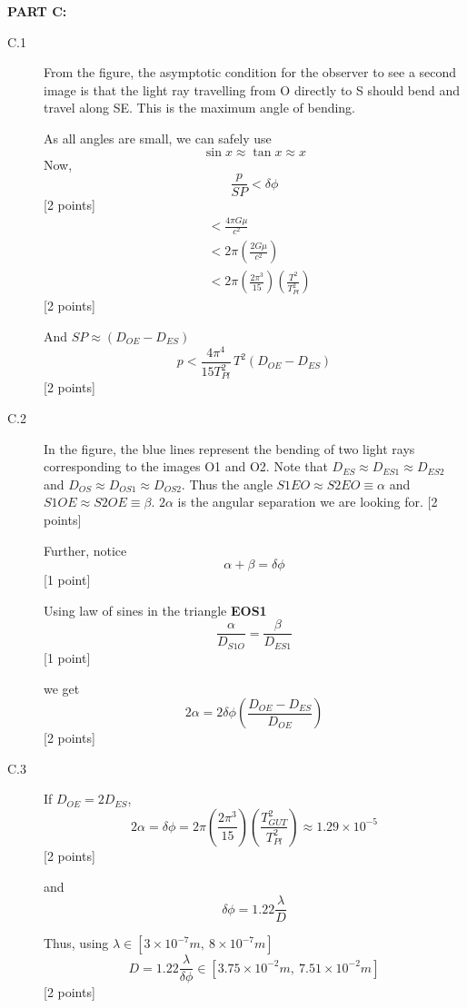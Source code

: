 \textbf{PART C:}

\begin{description}
\item[C.1] From the figure, the asymptotic condition for the observer to
  see a second image is that the light ray travelling from O directly to
  S should bend and travel along SE. This is the maximum angle of
  bending.

  As all angles are small, we can safely use
  \[ \sin x \approx \tan x \approx x \]
  Now,
  \[ \frac{p}{SP} < \delta\phi \]
  \hfill[2 points]
  \begin{align*}
  &< \frac{4\pi G\mu}{c^2}\\
  &< 2\pi\left(\frac{2G\mu}{c^2}\right)\\
  &< 2\pi\left(\frac{2\pi^3}{15}\right)
     \left(\frac{T^2}{T_{Pl}^2}\right)
  \end{align*}
  \hfill[2 points]

  And $SP \approx \left(D_{OE} - D_{ES}\right)$
  \[ p < \frac{4\pi^4}{15T_{Pl}^2}\,T^2\left(D_{OE} - D_{ES}\right) \]
  \hfill[2 points]


\item[C.2] In the figure, the blue lines represent the bending of two
  light rays corresponding to the images O1 and O2. Note that
  $D_{ES} \approx D_{ES1} \approx D_{ES2}$ and
  $D_{OS} \approx D_{OS1} \approx D_{OS2}$. Thus the angle
  $S1EO \approx S2EO \equiv \alpha$ and
  $S1OE \approx S2OE \equiv \beta$. $2\alpha$ is the angular separation
  we are looking for. \hfill[2 points]

  Further, notice
  \[ \alpha + \beta = \delta\phi \]
  \hfill[1 point]

  Using law of sines in the triangle \textbf{EOS1}
  \[ \frac{\alpha}{D_{S1O}} = \frac{\beta}{D_{ES1}} \]
  \hfill[1 point]

  we get
  \[ 2\alpha = 2\delta\phi
     \left(\frac{D_{OE} - D_{ES}}{D_{OE}}\right) \]
  \hfill[2 points]

\item[C.3] If $D_{OE} = 2D_{ES}$,
  \[ 2\alpha = \delta\phi
     = 2\pi\left(\frac{2\pi^3}{15}\right)
       \left(\frac{T_{GUT}^2}{T_{Pl}^2}\right)
     \approx 1.29\times 10^{-5} \]
  \hfill[2 points]

  and
  \[ \delta\phi = 1.22\frac{\lambda}{D} \]

  Thus, using
  $\lambda\in[3\times 10^{-7}m,\ 8\times 10^{-7}m]$
  \[ D = 1.22\frac{\lambda}{\delta\phi}
     \in\left[3.75\times 10^{-2}m,\ 7.51\times 10^{-2}m\right] \]
  \hfill[2 points]


\end{description}
